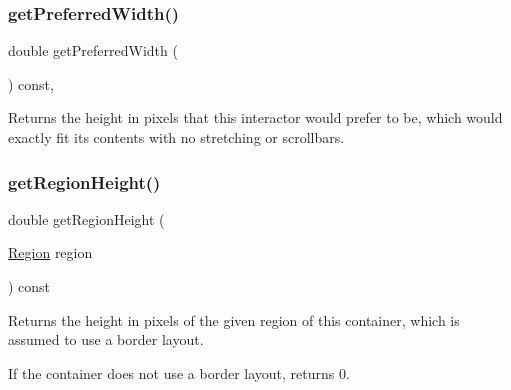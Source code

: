 \mbox{\label{classsgl_1_1GInteractor_a82bca31d37700fb0e35d2743352efd5e}} 
\subsubsection{\texorpdfstring{get\+Preferred\+Width()}{getPreferredWidth()}}
{\footnotesize\ttfamily double get\+Preferred\+Width (\begin{DoxyParamCaption}{ }\end{DoxyParamCaption}) const\hspace{0.3cm}{\ttfamily [virtual]}, {\ttfamily [inherited]}}



Returns the height in pixels that this interactor would prefer to be, which would exactly fit its contents with no stretching or scrollbars. 

\mbox{\label{classsgl_1_1GContainer_a164d248057318961e7f2abc8c3477d63}} 
\subsubsection{\texorpdfstring{get\+Region\+Height()}{getRegionHeight()}\hspace{0.1cm}{\footnotesize\ttfamily [1/2]}}
{\footnotesize\ttfamily double get\+Region\+Height (\begin{DoxyParamCaption}\item[{\mbox{\hyperlink{classsgl_1_1GContainer_a81a01a86de31071a92e6cce0bab9bc4b}{Region}}}]{region }\end{DoxyParamCaption}) const\hspace{0.3cm}{\ttfamily [virtual]}}



Returns the height in pixels of the given region of this container, which is assumed to use a border layout. 

If the container does not use a border layout, returns 0. \mbox{\label{classsgl_1_1GContainer_ae8a545e772745b89edaf9804a2dc0057}} 
